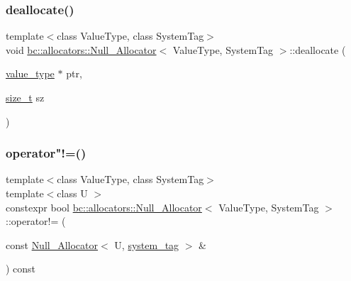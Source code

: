 \mbox{\label{structbc_1_1allocators_1_1Null__Allocator_a2c4a4fa554ab78a37bd18e3b0d85ac7d}} 
\subsubsection{\texorpdfstring{deallocate()}{deallocate()}}
{\footnotesize\ttfamily template$<$class Value\+Type, class System\+Tag$>$ \\
void \hyperlink{structbc_1_1allocators_1_1Null__Allocator}{bc\+::allocators\+::\+Null\+\_\+\+Allocator}$<$ Value\+Type, System\+Tag $>$\+::deallocate (\begin{DoxyParamCaption}\item[{\hyperlink{structbc_1_1allocators_1_1Null__Allocator_ac6562bbd777fc64599fdc6720f093815}{value\+\_\+type} $\ast$}]{ptr,  }\item[{\hyperlink{structbc_1_1allocators_1_1Null__Allocator_a24ad862d692b0676b201e15a3d18b53e}{size\+\_\+t}}]{sz }\end{DoxyParamCaption})\hspace{0.3cm}{\ttfamily [inline]}}

\mbox{\label{structbc_1_1allocators_1_1Null__Allocator_a83c71959a26d79cc9c45715909834c53}} 
\subsubsection{\texorpdfstring{operator"!=()}{operator!=()}}
{\footnotesize\ttfamily template$<$class Value\+Type, class System\+Tag$>$ \\
template$<$class U $>$ \\
constexpr bool \hyperlink{structbc_1_1allocators_1_1Null__Allocator}{bc\+::allocators\+::\+Null\+\_\+\+Allocator}$<$ Value\+Type, System\+Tag $>$\+::operator!= (\begin{DoxyParamCaption}\item[{const \hyperlink{structbc_1_1allocators_1_1Null__Allocator}{Null\+\_\+\+Allocator}$<$ U, \hyperlink{structbc_1_1allocators_1_1Null__Allocator_a5accbd7634ecdda0a5dbf54c28815e9e}{system\+\_\+tag} $>$ \&}]{ }\end{DoxyParamCaption}) const\hspace{0.3cm}{\ttfamily [inline]}}


